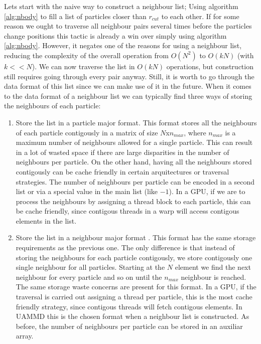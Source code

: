 \documentclass[ twoside,openright,titlepage,numbers=noenddot,%
headinclude,footinclude,cleardoublepage=empty,abstract=on,
BCOR=5mm,paper=a4,fontsize=11pt, dvipsnames
]{scrreprt}
\newcommand{\uammd}{\gls{UAMMD}\xspace}
\newcommand{\gpu}{\gls{GPU}\xspace}
\begin{document}
Lets start with the naive way to construct a neighbour list; Using algorithm \ref{alg:nbody} to fill a list of particles closer than $r_{cut}$ to each other. 
If for some reason we ought to traverse all neighbour pairs several times before the particles change positions this tactic is already a win over simply using algorithm \ref{alg:nbody}. However, it negates one of the reasons for using a neighbour list, reducing the complexity of the overall operation from $O(N^2)$ to $O(kN)$ (with $k<<N$). We can now traverse the list in $O(kN)$ operations, but construction still requires going through every pair anyway.
Still, it is worth to go through the data format of this list since we can make use of it in the future. When it comes to the data format of a neighbour list we can typically find three ways of storing the neighbours of each particle:
\begin{enumerate}
\item Store the list in a particle major format\cite{hoomd}\cite{lammps}.
  This format stores all the neighbours of each particle contigously in a matrix of size $N$x$n_{max}$, where $n_{max}$ is a maximum number of neighbours allowed for a single particle. This can result in a lot of wasted space if there are large disparities in the number of neighbours per particle. On the other hand, having all the neighbours stored contigously can be cache friendly in certain arquitectures or traversal strategies. The number of neighbours per particle can be encoded in a second list or via a special value in the main list (like $-1$). In a \gpu, if we are to process the neighbours by assigning a thread block to each particle, this can be cache friendly, since contigous threads in a warp will access contigous elements in the list.
\item Store the list in a neighbour major format \cite{gromacs}.
  This format has the same storage requirements as the previous one. The only difference is that instead of storing the neighbours for each particle contigously, we store contigously one single neighbour for all particles. Starting at the $N$ element we find the next neighbour for every particle and so on until the $n_{max}$ neighbour is reached. The same storage waste concerns are present for this format. In a \gpu, if the traversal is carried out assigning a thread per particle, this is the most cache friendly strategy, since contigous threads will fetch contigous elements. In \uammd this is the chosen format when a neighbour list is constructed. 
  As before, the number of neighbours per particle can be stored in an auxiliar array.

\end{enumerate}
\end{document}
